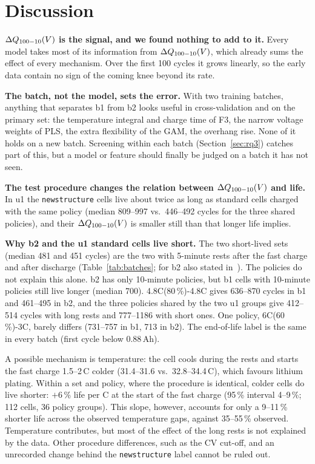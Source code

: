 \section{Discussion}
\label{sec:discussion}

\textbf{$\Delta Q_{100-10}(V)$ is the signal, and we found nothing to add to it.} Every model
takes most of its information from $\Delta Q_{100-10}(V)$, which already sums the effect of
every mechanism. Over the first 100 cycles it grows linearly, so the early
data contain no sign of the coming knee beyond its rate.

\textbf{The batch, not the model, sets the error.} With two training
batches, anything that separates b1 from b2 looks useful in
cross-validation and on the primary set: the temperature integral and charge
time of F3, the narrow voltage weights of PLS, the extra flexibility of the
GAM, the overhang rise. None of it holds on a new batch. Screening within
each batch (Section~\ref{sec:rq3}) catches part of this, but a model or
feature should finally be judged on a batch it has not seen.

\textbf{The test procedure changes the relation between $\Delta Q_{100-10}(V)$ and life.} In
u1 the \texttt{newstructure} cells live about twice as long as standard
cells charged with the same policy (median 809--997 vs.\ 446--492 cycles for
the three shared policies), and their $\Delta Q_{100-10}(V)$ is smaller still than that longer
life implies.

\textbf{Why b2 and the u1 standard cells live short.} The two short-lived
sets (median 481 and 451 cycles) are the two with 5-minute rests after the
fast charge and after discharge (Table~\ref{tab:batches}; for b2 also stated
in~\cite{severson2019}). The policies do not explain this alone. b2 has only
10-minute policies, but b1 cells with 10-minute policies still live longer
(median 700). 4.8C(80\,\%)-4.8C gives 636--870 cycles in b1 and 461--495 in
b2, and the three policies shared by the two u1 groups give 412--514 cycles
with long rests and 777--1186 with short ones. One policy, 6C(60\,\%)-3C,
barely differs (731--757 in b1, 713 in b2). The end-of-life label is the
same in every batch (first cycle below 0.88\,Ah).

A possible mechanism is temperature: the cell cools during the rests and
starts the fast charge 1.5--2\,\textdegree C colder (31.4--31.6 vs.\
32.8--34.4\,\textdegree C), which favours lithium plating. Within a set and
policy, where the procedure is identical, colder cells do live shorter:
$+6$\,\% life per \textdegree C at the start of the fast charge (95\,\%
interval 4--9\,\%; 112 cells, 36 policy groups). This slope, however,
accounts for only a 9--11\,\% shorter life across the observed temperature
gaps, against 35--55\,\% observed. Temperature contributes, but most of the
effect of the long rests is not explained by the data. Other procedure
differences, such as the CV cut-off, and an unrecorded change behind the
\texttt{newstructure} label cannot be ruled out.

